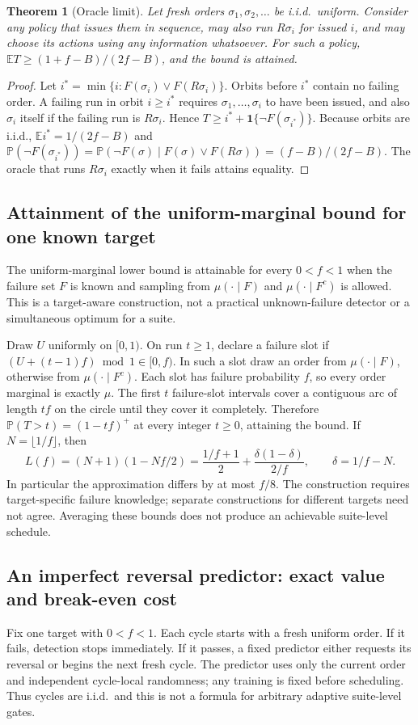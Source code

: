 \documentclass[11pt,a4paper]{article}
\newtheorem{theorem}{Theorem}[section]
\theoremstyle{definition}\newtheorem{definition}[theorem]{Definition}
\theoremstyle{remark}\newtheorem{remark}[theorem]{Remark}
\newcommand{\E}{\mathbb E}
\newcommand{\Prb}{\mathbb P}
\theoremstyle{definition}\newtheorem{xexample}[xtheorem]{Example}\theoremstyle{plain}
\begin{document}
\begin{theorem}[Oracle limit]
Let fresh orders $\sigma_1,\sigma_2,\dots$ be i.i.d.\ uniform. Consider any policy that issues them in sequence, may also run $R\sigma_i$ for issued $i$, and may choose its actions using any information whatsoever. For such a policy, $\E T\ge(1+f-B)/(2f-B)$, and the bound is attained.
\end{theorem}
\begin{proof}
Let $i^\ast=\min\{i:F(\sigma_i)\vee F(R\sigma_i)\}$. Orbits before $i^\ast$ contain no failing order. A failing run in orbit $i\ge i^\ast$ requires $\sigma_1,\dots,\sigma_i$ to have been issued, and also $\sigma_i$ itself if the failing run is $R\sigma_i$. Hence $T\ge i^\ast+\mathbf 1\{\neg F(\sigma_{i^\ast})\}$. Because orbits are i.i.d., $\E i^\ast=1/(2f-B)$ and $\Prb(\neg F(\sigma_{i^\ast}))=\Prb(\neg F(\sigma)\mid F(\sigma)\vee F(R\sigma))=(f-B)/(2f-B)$. The oracle that runs $R\sigma_i$ exactly when it fails attains equality.
\end{proof}

\subsection{Attainment of the uniform-marginal bound for one known target}
The uniform-marginal lower bound is attainable for every $0<f<1$ when the failure set $F$ is known and sampling from $\mu(\cdot\mid F)$ and $\mu(\cdot\mid F^c)$ is allowed. This is a target-aware construction, not a practical unknown-failure detector or a simultaneous optimum for a suite.

Draw $U$ uniformly on $[0,1)$. On run $t\ge1$, declare a failure slot if $(U+(t-1)f)\bmod1\in[0,f)$. In such a slot draw an order from $\mu(\cdot\mid F)$, otherwise from $\mu(\cdot\mid F^c)$. Each slot has failure probability $f$, so every order marginal is exactly $\mu$. The first $t$ failure-slot intervals cover a contiguous arc of length $tf$ on the circle until they cover it completely. Therefore $\Prb(T>t)=(1-tf)^+$ at every integer $t\ge0$, attaining the bound. If $N=\lfloor1/f\rfloor$, then
\[
 L(f)=(N+1)(1-Nf/2)=\frac{1/f+1}{2}+\frac{\delta(1-\delta)}{2/f},
 \qquad \delta=1/f-N.
\]
In particular the approximation differs by at most $f/8$. The construction requires target-specific failure knowledge; separate constructions for different targets need not agree. Averaging these bounds does not produce an achievable suite-level schedule.

\subsection{An imperfect reversal predictor: exact value and break-even cost}\label{sec:predictor}
Fix one target with $0<f<1$. Each cycle starts with a fresh uniform order. If it fails, detection stops immediately. If it passes, a fixed predictor either requests its reversal or begins the next fresh cycle. The predictor uses only the current order and independent cycle-local randomness; any training is fixed before scheduling. Thus cycles are i.i.d.\ and this is not a formula for arbitrary adaptive suite-level gates.
\end{document}
